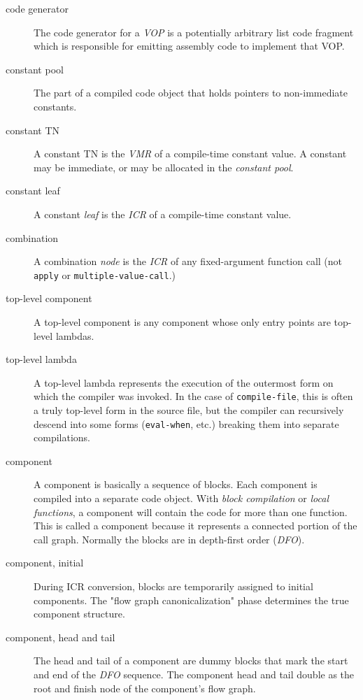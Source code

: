 \begin{description}
\item[code generator] The code generator for a {\it VOP} is a potentially
arbitrary list code fragment which is responsible for emitting assembly code to
implement that VOP.

\item[constant pool] The part of a compiled code object that holds pointers to
non-immediate constants.

\item[constant TN]
A constant TN is the {\it VMR} of a compile-time constant value.  A
constant may be immediate, or may be allocated in the {\it constant pool}.

\item[constant leaf]
A constant {\it leaf} is the {\it ICR} of a compile-time constant value.

\item[combination]
A combination {\it node} is the {\it ICR} of any fixed-argument function
call (not {\tt apply} or {\tt multiple-value-call}.)  

\item[top-level component]
A top-level component is any component whose only entry points are top-level
lambdas.

\item[top-level lambda]
A top-level lambda represents the execution of the outermost form on which
the compiler was invoked.  In the case of {\tt compile-file}, this is often a
truly top-level form in the source file, but the compiler can recursively
descend into some forms ({\tt eval-when}, etc.) breaking them into separate
compilations.

\item[component] A component is basically a sequence of blocks.  Each component
is compiled into a separate code object.  With {\it block compilation} or {\it
local functions}, a component will contain the code for more than one function.
This is called a component because it represents a connected portion of the
call graph.  Normally the blocks are in depth-first order ({\it DFO}).

\item[component, initial] During ICR conversion, blocks are temporarily
assigned to initial components.  The "flow graph canonicalization" phase
determines the true component structure.

\item[component, head and tail]
The head and tail of a component are dummy blocks that mark the start and
end of the {\it DFO} sequence.  The component head and tail double as the root
and finish node of the component's flow graph.


\end{description}
